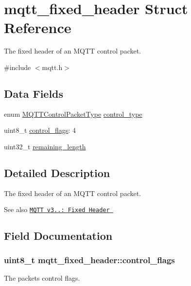 \hypertarget{structmqtt__fixed__header}{}\section{mqtt\+\_\+fixed\+\_\+header Struct Reference}
\label{structmqtt__fixed__header}


The fixed header of an M\+Q\+TT control packet.  




{\ttfamily \#include $<$mqtt.\+h$>$}

\subsection*{Data Fields}
\begin{DoxyCompactItemize}
\item 
enum \hyperlink{group__unpackers_gacbd36b88ec7f62bc161b07e1a0aed679}{M\+Q\+T\+T\+Control\+Packet\+Type} \hyperlink{structmqtt__fixed__header_a9bdea10facdc20756c457f282d58cfa1}{control\+\_\+type}
\item 
uint8\+\_\+t \hyperlink{structmqtt__fixed__header_a8a2fad017b26ae1b71c825dd78fd9154}{control\+\_\+flags}\+: 4
\item 
uint32\+\_\+t \hyperlink{structmqtt__fixed__header_ac01e888a49b83e3d34ca14f140b72d7a}{remaining\+\_\+length}
\end{DoxyCompactItemize}


\subsection{Detailed Description}
The fixed header of an M\+Q\+TT control packet. 

\begin{DoxySeeAlso}{See also}
\href{http://docs.oasis-open.org/mqtt/mqtt/v3.1.1/os/mqtt-v3.1.1-os.html#_Toc398718020}{\tt M\+Q\+TT v3..\+: Fixed Header } 
\end{DoxySeeAlso}


\subsection{Field Documentation}
\subsubsection[{\texorpdfstring{control\+\_\+flags}{control_flags}}]{\setlength{\rightskip}{0pt plus 5cm}uint8\+\_\+t mqtt\+\_\+fixed\+\_\+header\+::control\+\_\+flags}\hypertarget{structmqtt__fixed__header_a8a2fad017b26ae1b71c825dd78fd9154}{}\label{structmqtt__fixed__header_a8a2fad017b26ae1b71c825dd78fd9154}
The packets control flags. 
